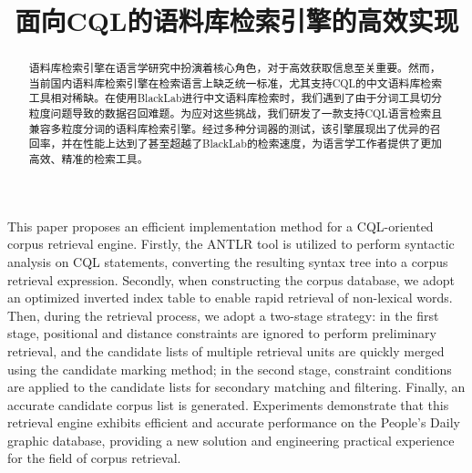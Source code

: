 \documentclass[11pt]{article}
\title{面向CQL的语料库检索引擎的高效实现}
\date{}
\begin{document}
\begin{CJK*}{UTF8}{gbsn}
\setlength{\parindent}{2em}

\maketitle
\begin{abstract}
  
语料库检索引擎在语言学研究中扮演着核心角色，对于高效获取信息至关重要。然而，当前国内语料库检索引擎在检索语言上缺乏统一标准，尤其支持CQL的中文语料库检索工具相对稀缺。在使用BlackLab进行中文语料库检索时，我们遇到了由于分词工具切分粒度问题导致的数据召回难题。为应对这些挑战，我们研发了一款支持CQL语言检索且兼容多粒度分词的语料库检索引擎。经过多种分词器的测试，该引擎展现出了优异的召回率，并在性能上达到了甚至超越了BlackLab的检索速度，为语言学工作者提供了更加高效、精准的检索工具。


\end{abstract}

\makeenglishtitle
\begin{englishabstract}
	
This paper proposes an efficient implementation method for a CQL-oriented corpus retrieval engine. Firstly, the ANTLR tool is utilized to perform syntactic analysis on CQL statements, converting the resulting syntax tree into a corpus retrieval expression. Secondly, when constructing the corpus database, we adopt an optimized inverted index table to enable rapid retrieval of non-lexical words. Then, during the retrieval process, we adopt a two-stage strategy: in the first stage, positional and distance constraints are ignored to perform preliminary retrieval, and the candidate lists of multiple retrieval units are quickly merged using the candidate marking method; in the second stage, constraint conditions are applied to the candidate lists for secondary matching and filtering. Finally, an accurate candidate corpus list is generated. Experiments demonstrate that this retrieval engine exhibits efficient and accurate performance on the People's Daily graphic database, providing a new solution and engineering practical experience for the field of corpus retrieval.


\end{englishabstract}
\end{CJK*}
\end{document}

